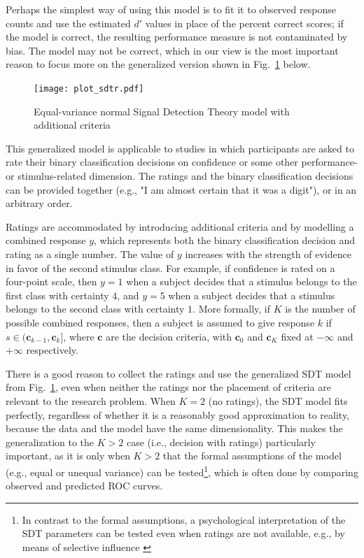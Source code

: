 \documentclass[a4paper,man,apacite,floatsintext]{apa6}
\begin{document}
Perhaps the simplest way of using this model is to fit it to observed
response counts and use the estimated $d'$ values in place of the
percent correct scores; if the model is correct, the resulting
performance measure is not contaminated by bias. The model may not be
correct, which in our view is the most important reason to focus more
on the generalized version shown in Fig.~\ref{sdtr} below.


\begin{figure}[H]
  \centering
  \texttt{[image: plot\_sdtr.pdf]}
  \caption{Equal-variance normal Signal Detection Theory model with
    additional criteria}
  \label{sdtr}
\end{figure}

This generalized model is applicable to studies in which participants
are asked to rate their binary classification decisions on confidence
or some other performance- or stimulus-related dimension. The ratings
and the binary classification decisions can be provided together
(e.g., "I am almost certain that it was a digit"), or in an arbitrary
order.

Ratings are accommodated by introducing additional criteria and by
modelling a combined response $y$, which represents both the binary
classification decision and rating as a single number. The value of
$y$ increases with the strength of evidence in favor of the second
stimulus class. For example, if confidence is rated on a four-point
scale, then $y = 1$ when a subject decides that a stimulus belongs to
the first class with certainty $4$, and $y = 5$ when a subject decides
that a stimulus belongs to the second class with certainty $1$. More
formally, if $K$ is the number of possible combined responses, then a
subject is assumed to give response $k$ if $s \in
(\bm{c}_{k-1},\bm{c}_k]$, where $\bm{c}$ are the decision criteria,
  with $\bm{c}_0$ and $\bm{c}_K$ fixed at $-\infty$ and $+\infty$
  respectively.

There is a good reason to collect the ratings and use the generalized
SDT model from Fig.~\ref{sdtr}, even when neither the ratings nor the
placement of criteria are relevant to the research problem. When $K =
2$ (no ratings), the SDT model fits perfectly, regardless of whether
it is a reasonably good approximation to reality, because the data and
the model have the same dimensionality. This makes the generalization
to the $K > 2$ case (i.e., decision with ratings) particularly
important, as it is only when $K > 2$ that the formal assumptions of
the model (e.g., equal or unequal variance) can be tested\footnote{In
  contrast to the formal assumptions, a psychological interpretation
  of the SDT parameters can be tested even when ratings are not
  available, e.g., by means of selective influence
  \cite{sternberg2001separate}}, which is often done by comparing
observed and predicted ROC curves.
\end{document}
